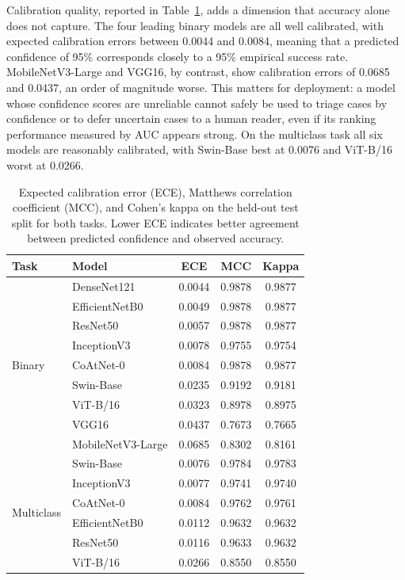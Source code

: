 \documentclass[final,3p,times,number]{elsarticle}
\begin{document}
Calibration quality, reported in Table~\ref{tab:calibration}, adds a dimension that accuracy alone does not capture. The four leading binary models are all well calibrated, with expected calibration errors between 0.0044 and 0.0084, meaning that a predicted confidence of 95\% corresponds closely to a 95\% empirical success rate. MobileNetV3-Large and VGG16, by contrast, show calibration errors of 0.0685 and 0.0437, an order of magnitude worse. This matters for deployment: a model whose confidence scores are unreliable cannot safely be used to triage cases by confidence or to defer uncertain cases to a human reader, even if its ranking performance measured by AUC appears strong. On the multiclass task all six models are reasonably calibrated, with Swin-Base best at 0.0076 and ViT-B/16 worst at 0.0266.

\begin{table}[htbp]
\centering
\caption{Expected calibration error (ECE), Matthews correlation coefficient (MCC), and Cohen's kappa on the held-out test split for both tasks. Lower ECE indicates better agreement between predicted confidence and observed accuracy.}
\label{tab:calibration}
\small
\begin{tabular*}{\textwidth}{@{\extracolsep{\fill}}llccc@{}}
\toprule
Task & Model & ECE & MCC & Kappa \\
\midrule
\multirow{9}{*}{Binary}
 & DenseNet121 & 0.0044 & 0.9878 & 0.9877 \\
 & EfficientNetB0 & 0.0049 & 0.9878 & 0.9877 \\
 & ResNet50 & 0.0057 & 0.9878 & 0.9877 \\
 & InceptionV3 & 0.0078 & 0.9755 & 0.9754 \\
 & CoAtNet-0 & 0.0084 & 0.9878 & 0.9877 \\
 & Swin-Base & 0.0235 & 0.9192 & 0.9181 \\
 & ViT-B/16 & 0.0323 & 0.8978 & 0.8975 \\
 & VGG16 & 0.0437 & 0.7673 & 0.7665 \\
 & MobileNetV3-Large & 0.0685 & 0.8302 & 0.8161 \\
\midrule
\multirow{6}{*}{Multiclass}
 & Swin-Base & 0.0076 & 0.9784 & 0.9783 \\
 & InceptionV3 & 0.0077 & 0.9741 & 0.9740 \\
 & CoAtNet-0 & 0.0084 & 0.9762 & 0.9761 \\
 & EfficientNetB0 & 0.0112 & 0.9632 & 0.9632 \\
 & ResNet50 & 0.0116 & 0.9633 & 0.9632 \\
 & ViT-B/16 & 0.0266 & 0.8550 & 0.8550 \\
\bottomrule
\end{tabular*}
\end{table}
\end{document}
